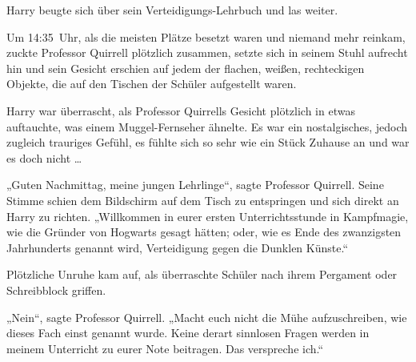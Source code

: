 Harry beugte sich über sein Verteidigungs-Lehrbuch und las weiter.

\later

Um 14:35~Uhr, als die meisten Plätze besetzt waren und niemand mehr reinkam, zuckte Professor Quirrell plötzlich zusammen, setzte sich in seinem Stuhl aufrecht hin und sein Gesicht erschien auf jedem der flachen, weißen, rechteckigen Objekte, die auf den Tischen der Schüler aufgestellt waren.

Harry war überrascht, als Professor Quirrells Gesicht plötzlich in etwas auftauchte, was einem Muggel-Fernseher ähnelte. Es war ein nostalgisches, jedoch zugleich trauriges Gefühl, es fühlte sich so sehr wie ein Stück Zuhause an und war es doch nicht …

„Guten Nachmittag, meine jungen Lehrlinge“, sagte Professor Quirrell. Seine Stimme schien dem Bildschirm auf dem Tisch zu entspringen und sich direkt an Harry zu richten.
„Willkommen in eurer ersten Unterrichtsstunde in Kampfmagie, wie die Gründer von Hogwarts gesagt hätten; oder, wie es Ende des zwanzigsten Jahrhunderts genannt wird, Verteidigung gegen die Dunklen Künste.“

Plötzliche Unruhe kam auf, als überraschte Schüler nach ihrem Pergament oder Schreibblock griffen.

„Nein“, sagte Professor Quirrell.
„Macht euch nicht die Mühe aufzuschreiben, wie dieses Fach einst genannt wurde. Keine derart sinnlosen Fragen werden in meinem Unterricht zu eurer Note beitragen. Das verspreche ich.“

